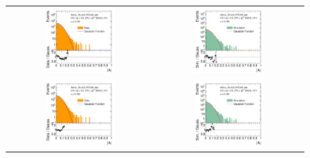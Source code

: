 \begin{figure}[!htp]   
  \centering
  \begin{tabular}{cc}
                \includegraphics[width=0.49\textwidth]{figures/AsymmHistosDataWithRatio_Eta0_pt5_alpha2_final_nominal_NoTruncation_v4.pdf} &
                \includegraphics[width=0.49\textwidth]{figures/AsymmHistosSimWithRatio_Eta0_pt5_alpha2_final_nominal_NoTruncation_v4.pdf} \\ 
                \includegraphics[width=0.49\textwidth]{figures/AsymmHistosDataWithRatio_Eta0_pt5_alpha2_final_nominal_v4.pdf} &
                \includegraphics[width=0.49\textwidth]{figures/AsymmHistosSimWithRatio_Eta0_pt5_alpha2_final_nominal_v4.pdf} \\

\end{tabular}
\end{figure}
